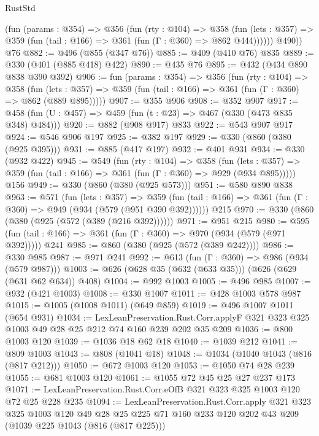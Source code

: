 \begin{lexlean}{RustStd}
\begin{coremodule}
          (fun (params : @354) =>
          @356
            (fun (rty : @104) =>
            @358
              (fun (lets : @357) =>
              @359 (fun (tail : @166) => @361 (fun (Γ : @360) => @862 @444))))))
        @490))
    @76
@882 := @496 (@855 (@347 @76))
@885 := @409 (@410 @76) @835
@889 := @330 (@401 (@885 @418) @422)
@890 := @435 @76
@895 := @432 (@434 @890 @838 @390 @392)
@906 := fun (params : @354) =>
  @356
    (fun (rty : @104) =>
    @358
      (fun (lets : @357) => @359 (fun (tail : @166) => @361 (fun (Γ : @360) => @862 (@889 @895)))))
@907 := @355 @906
@908 := @352 @907
@917 := @458 (fun (U : @457) => @459 (fun (t : @23) => @467 (@330 (@473 @835 @348) @484)))
@920 := @882 (@908 @917) @833
@922 := @543 @907 @917
@924 := @546 @906 @197
@925 := @382 @197
@929 := @330 (@860 (@380 (@925 @395)))
@931 := @885 (@417 @197)
@932 := @401 @931
@934 := @330 (@932 @422)
@945 := @549
    (fun (rty : @104) =>
    @358
      (fun (lets : @357) => @359 (fun (tail : @166) => @361 (fun (Γ : @360) => @929 (@934 @895)))))
    @156
@949 := @330 (@860 (@380 (@925 @573)))
@951 := @580 @890 @838
@963 := @571
    (fun (lets : @357) =>
    @359 (fun (tail : @166) => @361 (fun (Γ : @360) => @949 (@934 (@579 (@951 @390 @392))))))
    @215
@970 := @330 (@860 (@380 (@925 (@572 (@389 (@216 @392))))))
@971 := @951 @215
@980 := @595 (fun (tail : @166) => @361 (fun (Γ : @360) => @970 (@934 (@579 (@971 @392))))) @241
@985 := @860 (@380 (@925 (@572 (@389 @242))))
@986 := @330 @985
@987 := @971 @241
@992 := @613 (fun (Γ : @360) => @986 (@934 (@579 @987)))
@1003 := @626 (@628 @35 (@632 (@633 @35))) (@626 (@629 (@631 @62 @634)) @408)
@1004 := @992 @1003
@1005 := @496 @985
@1007 := @932 (@421 @1003)
@1008 := @330 @1007
@1011 := @428 @1003 @578 @987
@1015 := @1005 (@1008 @1011) (@649 @859)
@1019 := @496 @1007 @1011 (@654 @931)
@1034 := LexLeanPreservation.Rust.Corr.applyF
    @321
    @323
    @325
    @1003
    @49
    @28
    @25
    @212
    @74
    @160
    @239
    @202
    @35
    @209
@1036 := @800 @1003 @120
@1039 := @1036 @18 @62 @18
@1040 := @1039 @212
@1041 := @809 @1003
@1043 := @808 (@1041 @18)
@1048 := @1034 (@1040 @1043 (@816 (@817 @212)))
@1050 := @672 @1003 @120
@1053 := @1050 @74 @28 @239
@1055 := @681 @1003 @120
@1061 := @1055 @72 @45 @25 @27 @237 @173
@1071 := LexLeanPreservation.Rust.Corr.eOfB @321 @323 @325 @1003 @120 @72 @25 @228 @235
@1094 := LexLeanPreservation.Rust.Corr.apply
    @321
    @323
    @325
    @1003
    @120
    @49
    @28
    @25
    @225
    @71
    @160
    @233
    @120
    @202
    @43
    @209
    (@1039 @225 @1043 (@816 (@817 @225)))

\end{coremodule}
\end{lexlean}

